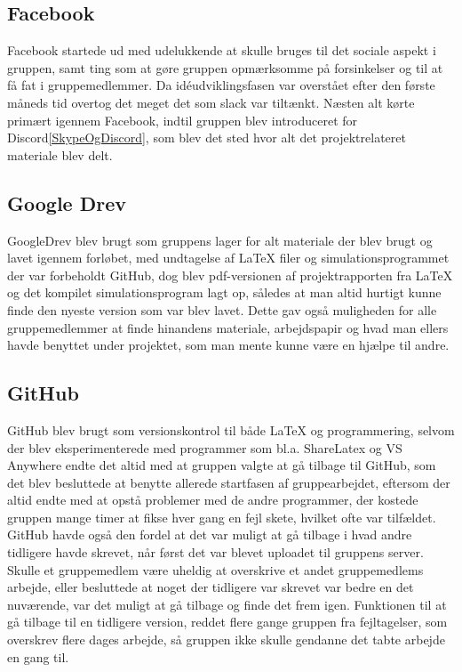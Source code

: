 \subsection*{Facebook}\label{Facebook}
Facebook startede ud med udelukkende at skulle bruges til det sociale aspekt i gruppen, samt ting som at gøre gruppen opmærksomme på forsinkelser og til at få fat i gruppemedlemmer. Da idéudviklingsfasen var overstået efter den første måneds tid overtog det meget det som slack var tiltænkt. Næsten alt kørte primært igennem Facebook, indtil gruppen blev introduceret for Discord\ref{SkypeOgDiscord}, som blev det sted hvor alt det projektrelateret materiale blev delt.      

\subsection*{Google Drev}\label{GoogleDrev}
GoogleDrev blev brugt som gruppens lager for alt materiale der blev brugt og lavet igennem forløbet, med undtagelse af LaTeX filer og simulationsprogrammet der var forbeholdt GitHub, dog blev pdf-versionen af projektrapporten fra LaTeX og det kompilet simulationsprogram lagt op, således at man altid hurtigt kunne finde den nyeste version som var blev lavet. Dette gav også muligheden for alle gruppemedlemmer at finde hinandens materiale, arbejdspapir og hvad man ellers havde benyttet under projektet, som man mente kunne være en hjælpe til andre.

\subsection*{GitHub}\label{GitHub}
GitHub blev brugt som versionskontrol til både LaTeX og programmering, selvom der blev eksperimenterede med programmer som bl.a. ShareLatex og VS Anywhere endte det altid med at gruppen valgte at gå tilbage til GitHub, som det blev besluttede at benytte allerede startfasen af gruppearbejdet, eftersom der altid endte med at opstå problemer med de andre programmer, der kostede gruppen mange timer at fikse hver gang en fejl skete, hvilket ofte var tilfældet. GitHub havde også den fordel at det var muligt at gå tilbage i hvad andre tidligere havde skrevet, når først det var blevet uploadet til gruppens server. Skulle et gruppemedlem være uheldig at overskrive et andet gruppemedlems arbejde, eller besluttede at noget der tidligere var skrevet var bedre en det nuværende, var det muligt at gå tilbage og finde det frem igen. Funktionen til at gå tilbage til en tidligere version, reddet flere gange gruppen fra fejltagelser, som overskrev flere dages arbejde, så gruppen ikke skulle gendanne det tabte arbejde en gang til. 

